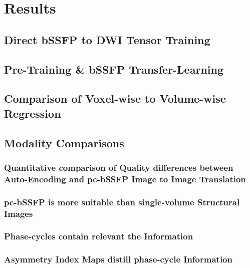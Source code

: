 \chapter{Results}\label{\positionnumber}

\section{Direct bSSFP to DWI Tensor Training}

\section{Pre-Training \& bSSFP Transfer-Learning}

\section{Comparison of Voxel-wise to Volume-wise Regression}

\section{Modality Comparisons}
\subsection{Quantitative comparison of Quality differences between Auto-Encoding and pc-bSSFP Image to Image Translation}
\subsection{pc-bSSFP is more suitable than single-volume Structural Images}
\subsection{Phase-cycles contain relevant the Information}
\subsection{Asymmetry Index Maps distill phase-cycle Information}








